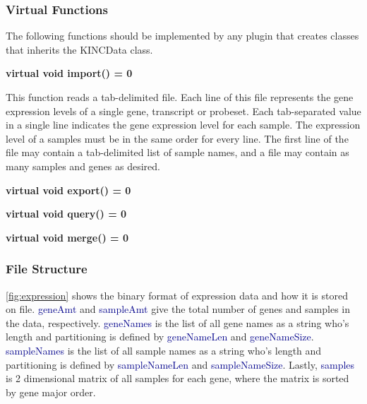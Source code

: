 \documentclass[10pt]{article}
\providecommand{\h}[1]{\textcolor{darkblue}{#1}}
\begin{document}
\subsubsection{Virtual Functions}

The following functions should be implemented by any plugin that creates
classes that inherits the KINCData class.

{\bfseries virtual void import() = 0}

This function reads a tab-delimited file.  Each line of this file
represents the gene expression levels of a single gene, transcript or probeset.
Each tab-separated value in a single line indicates the gene expression level 
for each sample. The expression level of a samples must be in the same 
order for every line.  The first line of the file may contain a tab-delimited
list of sample names, and a file may contain as many samples and genes as
desired.

{\bfseries virtual void export() = 0}

{\bfseries virtual void query() = 0}

{\bfseries virtual void merge() = 0}


\subsubsection{File Structure}

\autoref{fig:expression} shows the binary format of expression data and how it 
is stored on file. \h{geneAmt} and \h{sampleAmt} give the total number of genes 
and samples in the data, respectively. \h{geneNames} is the list of all gene 
names as a string who's length and partitioning is defined by \h{geneNameLen} 
and \h{geneNameSize}. \h{sampleNames} is the list of all sample names as a 
string who's length and partitioning is defined by \h{sampleNameLen} and 
\h{sampleNameSize}. Lastly, \h{samples} is 2 dimensional matrix of all samples 
for each gene, where the matrix is sorted by gene major order.
\end{document}
